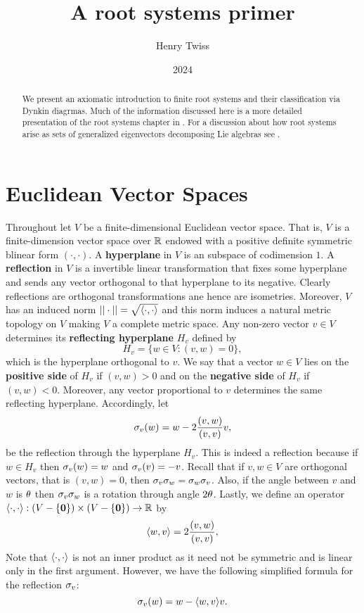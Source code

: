 \documentclass[12pt,reqno,oneside]{amsart}
\title{A root systems primer}
\author{Henry Twiss}
\date{2024}
\begin{document}
\begin{abstract}
    We present an axiomatic introduction to finite root systems and their classification via Dynkin diagrmas. Much of the information discussed here is a more detailed presentation of the root systems chapter in \cite{Hu}. For a discussion about how root systems arise as sets of generalized eigenvectors decomposing Lie algebras see \cite{Hu}.
\end{abstract}

\maketitle

\section{Euclidean Vector Spaces}
    Throughout let $V$ be a finite-dimensional Euclidean vector space. That is, $V$ is a finite-dimension vector space over $\mathbb{R}$ endowed with a positive definite symmetric blinear form $(\cdot,\cdot)$. A \textbf{hyperplane} in $V$ is an subspace of codimension $1$. A \textbf{reflection} in $V$ is a invertible linear transformation that fixes some hyperplane and sends any vector orthogonal to that hyperplane to its negative. Clearly reflections are orthogonal transformations ane hence are isometries. Moreover, $V$ has an induced norm $||\cdot|| = \sqrt{\langle\cdot,\cdot\rangle}$ and this norm induces a natural metric topology on $V$ making $V$ a complete metric space. Any non-zero vector $v \in V$ determines its \textbf{reflecting hyperplane} $H_{v}$ defined by
    \[
        H_{v} = \{w \in V:(v,w) = 0\},
    \]
    which is the hyperplane orthogonal to $v$. We say that a vector $w \in V$ lies on the \textbf{positive side} of $H_{v}$ if $(v,w) > 0$ and on the \textbf{negative side} of $H_{v}$ if $(v,w) < 0$. Moreover, any vector proportional to $v$ determines the same reflecting hyperplane. Accordingly, let
    \[
        \sigma_{v}(w) = w-2\frac{(v,w)}{(v,v)}v, 
    \]
    be the reflection through the hyperplane $H_{v}$. This is indeed a reflection because if $w \in H_{v}$ then $\sigma_{v}(w) = w$ and $\sigma_{v}(v) = -v$. Recall that if $v,w \in V$ are orthogonal vectors, that is $(v,w) = 0$, then $\sigma_{v}\sigma_{w} = \sigma_{w}\sigma_{v}$. Also, if the angle between $v$ and $w$ is $\theta$ then $\sigma_{v}\sigma_{w}$ is a rotation through angle $2\theta$. Lastly, we define an operator $\langle\cdot,\cdot\rangle:(V-\{\mathbf{0}\}) \times (V-\{\mathbf{0}\}) \to \mathbb{R}$ by
    \[
        \langle w,v\rangle = 2\frac{(v,w)}{(v,v)},
    \]
    Note that $\langle\cdot,\cdot\rangle$ is not an inner product as it need not be symmetric and is linear only in the first argument. However, we have the following simplified formula for the reflection $\sigma_{v}$:
    \[
        \sigma_{v}(w) = w-\langle w,v\rangle v.
    \]
\end{document}
